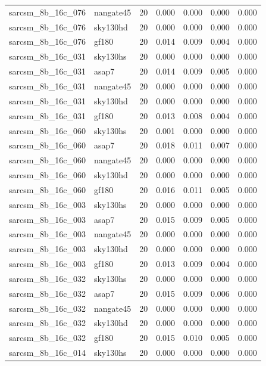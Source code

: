 \begin{tabular}{llrrrrr}
sarcsm\_8b\_16c\_076 & nangate45 & 20 & 0.000 & 0.000 & 0.000 & 0.000 \\
sarcsm\_8b\_16c\_076 & sky130hd & 20 & 0.000 & 0.000 & 0.000 & 0.000 \\
sarcsm\_8b\_16c\_076 & gf180 & 20 & 0.014 & 0.009 & 0.004 & 0.000 \\
sarcsm\_8b\_16c\_031 & sky130hs & 20 & 0.000 & 0.000 & 0.000 & 0.000 \\
sarcsm\_8b\_16c\_031 & asap7 & 20 & 0.014 & 0.009 & 0.005 & 0.000 \\
sarcsm\_8b\_16c\_031 & nangate45 & 20 & 0.000 & 0.000 & 0.000 & 0.000 \\
sarcsm\_8b\_16c\_031 & sky130hd & 20 & 0.000 & 0.000 & 0.000 & 0.000 \\
sarcsm\_8b\_16c\_031 & gf180 & 20 & 0.013 & 0.008 & 0.004 & 0.000 \\
sarcsm\_8b\_16c\_060 & sky130hs & 20 & 0.001 & 0.000 & 0.000 & 0.000 \\
sarcsm\_8b\_16c\_060 & asap7 & 20 & 0.018 & 0.011 & 0.007 & 0.000 \\
sarcsm\_8b\_16c\_060 & nangate45 & 20 & 0.000 & 0.000 & 0.000 & 0.000 \\
sarcsm\_8b\_16c\_060 & sky130hd & 20 & 0.000 & 0.000 & 0.000 & 0.000 \\
sarcsm\_8b\_16c\_060 & gf180 & 20 & 0.016 & 0.011 & 0.005 & 0.000 \\
sarcsm\_8b\_16c\_003 & sky130hs & 20 & 0.000 & 0.000 & 0.000 & 0.000 \\
sarcsm\_8b\_16c\_003 & asap7 & 20 & 0.015 & 0.009 & 0.005 & 0.000 \\
sarcsm\_8b\_16c\_003 & nangate45 & 20 & 0.000 & 0.000 & 0.000 & 0.000 \\
sarcsm\_8b\_16c\_003 & sky130hd & 20 & 0.000 & 0.000 & 0.000 & 0.000 \\
sarcsm\_8b\_16c\_003 & gf180 & 20 & 0.013 & 0.009 & 0.004 & 0.000 \\
sarcsm\_8b\_16c\_032 & sky130hs & 20 & 0.000 & 0.000 & 0.000 & 0.000 \\
sarcsm\_8b\_16c\_032 & asap7 & 20 & 0.015 & 0.009 & 0.006 & 0.000 \\
sarcsm\_8b\_16c\_032 & nangate45 & 20 & 0.000 & 0.000 & 0.000 & 0.000 \\
sarcsm\_8b\_16c\_032 & sky130hd & 20 & 0.000 & 0.000 & 0.000 & 0.000 \\
sarcsm\_8b\_16c\_032 & gf180 & 20 & 0.015 & 0.010 & 0.005 & 0.000 \\
sarcsm\_8b\_16c\_014 & sky130hs & 20 & 0.000 & 0.000 & 0.000 & 0.000 \\

\end{tabular}
